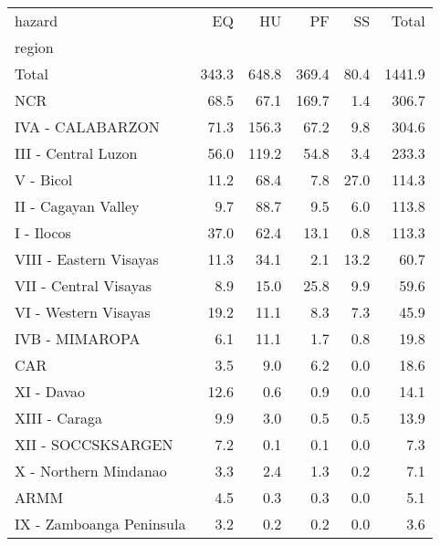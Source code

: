 \begin{tabular}{lrrrrr}
\toprule
hazard &     EQ &     HU &     PF &    SS &   Total \\
region                   &        &        &        &       &         \\
\midrule
Total                    &  343.3 &  648.8 &  369.4 &  80.4 &  1441.9 \\
NCR                      &   68.5 &   67.1 &  169.7 &   1.4 &   306.7 \\
IVA - CALABARZON         &   71.3 &  156.3 &   67.2 &   9.8 &   304.6 \\
III - Central Luzon      &   56.0 &  119.2 &   54.8 &   3.4 &   233.3 \\
V - Bicol                &   11.2 &   68.4 &    7.8 &  27.0 &   114.3 \\
II - Cagayan Valley      &    9.7 &   88.7 &    9.5 &   6.0 &   113.8 \\
I - Ilocos               &   37.0 &   62.4 &   13.1 &   0.8 &   113.3 \\
VIII - Eastern Visayas   &   11.3 &   34.1 &    2.1 &  13.2 &    60.7 \\
VII - Central Visayas    &    8.9 &   15.0 &   25.8 &   9.9 &    59.6 \\
VI - Western Visayas     &   19.2 &   11.1 &    8.3 &   7.3 &    45.9 \\
IVB - MIMAROPA           &    6.1 &   11.1 &    1.7 &   0.8 &    19.8 \\
CAR                      &    3.5 &    9.0 &    6.2 &   0.0 &    18.6 \\
XI - Davao               &   12.6 &    0.6 &    0.9 &   0.0 &    14.1 \\
XIII - Caraga            &    9.9 &    3.0 &    0.5 &   0.5 &    13.9 \\
XII - SOCCSKSARGEN       &    7.2 &    0.1 &    0.1 &   0.0 &     7.3 \\
X - Northern Mindanao    &    3.3 &    2.4 &    1.3 &   0.2 &     7.1 \\
ARMM                     &    4.5 &    0.3 &    0.3 &   0.0 &     5.1 \\
IX - Zamboanga Peninsula &    3.2 &    0.2 &    0.2 &   0.0 &     3.6 \\
\bottomrule
\end{tabular}
